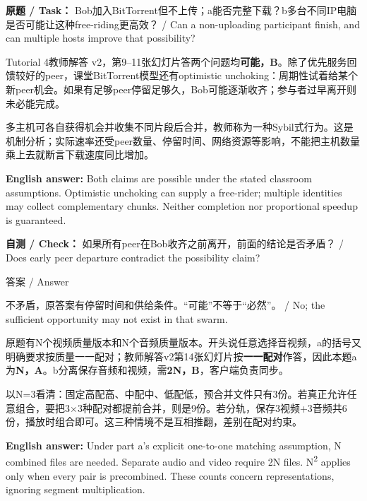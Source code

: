 \textbf{原题 / Task：} Bob加入BitTorrent但不上传；a能否完整下载？b多台不同IP电脑是否可能让这种free-riding更高效？ / Can a non-uploading participant finish, and can multiple hosts improve that possibility?


Tutorial 4教师解答 v2，第9–11张幻灯片答两个问题均\textbf{可能，B}。除了优先服务回馈较好的peer，课堂BitTorrent模型还有optimistic unchoking：周期性试着给某个新peer机会。如果有足够peer停留足够久，Bob可能逐渐收齐；参与者过早离开则未必能完成。


多主机可各自获得机会并收集不同片段后合并，教师称为一种Sybil式行为。这是机制分析；实际速率还受peer数量、停留时间、网络资源等影响，不能把主机数量乘上去就断言下载速度同比增加。


\textbf{English answer:} Both claims are possible under the stated classroom assumptions. Optimistic unchoking can supply a free-rider; multiple identities may collect complementary chunks. Neither completion nor proportional speedup is guaranteed.


\textbf{自测 / Check：} 如果所有peer在Bob收齐之前离开，前面的结论是否矛盾？ / Does early peer departure contradict the possibility claim?



\begin{StudySolution}{答案 / Answer}


不矛盾，原答案有停留时间和供给条件。“可能”不等于“必然”。 / No; the sufficient opportunity may not exist in that swarm.


\end{StudySolution}








原题有N个视频质量版本和N个音频质量版本。开头说任意选择音视频，a的括号又明确要求按质量一一配对；教师解答v2第14张幻灯片按\textbf{一一配对}作答，因此本题a为\textbf{N，A}。b分离保存音频和视频，需\textbf{2N，B}，客户端负责同步。


以N=3看清：固定高配高、中配中、低配低，预合并文件只有3份。若真正允许任意组合，要把3\ensuremath{\times}3种配对都提前合并，则是9份。若分轨，保存3视频+3音频共6份，播放时组合即可。这三种情境不是互相推翻，差别在配对约束。


\textbf{English answer:} Under part a's explicit one-to-one matching assumption, N combined files are needed. Separate audio and video require 2N files. N\textsuperscript{2} applies only when every pair is precombined. These counts concern representations, ignoring segment multiplication.



